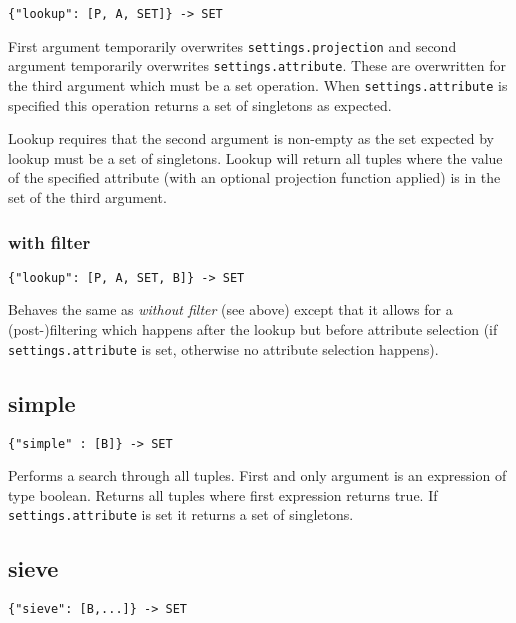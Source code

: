 \documentclass[a4paper]{article}
\begin{document}
\begin{verbatim}
{"lookup": [P, A, SET]} -> SET
\end{verbatim}

First argument temporarily overwrites \verb|settings.projection| and
second argument temporarily overwrites
\verb|settings.attribute|. These are overwritten for the third
argument which must be a set operation. When \verb|settings.attribute|
is specified this operation returns a set of singletons as expected.

Lookup requires that the second argument is non-empty as the set
expected by lookup must be a set of singletons. Lookup will return all
tuples where the value of the specified attribute (with an optional
projection function applied) is in the set of the third argument.

\subsubsection{with filter}

\begin{verbatim}
{"lookup": [P, A, SET, B]} -> SET
\end{verbatim}

Behaves the same as \textit{without filter} (see above) except that it
allows for a (post-)filtering which happens after the lookup but
before attribute selection (if \verb|settings.attribute| is set,
otherwise no attribute selection happens).


\subsection{simple}

\begin{verbatim}
{"simple" : [B]} -> SET
\end{verbatim}

Performs a search through all tuples. First and only argument is an
expression of type boolean. Returns all tuples where first expression
returns true. If \verb|settings.attribute| is set it returns a set of
singletons.

\subsection{sieve}

\begin{verbatim}
{"sieve": [B,...]} -> SET
\end{verbatim}
\end{document}

